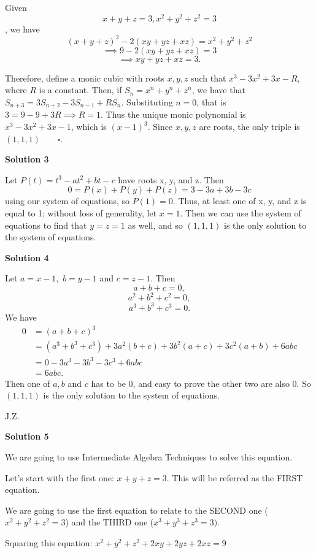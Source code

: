 \begin{enumerate}
Given 
 \[x+y+z = 3, x^2 + y^2 + z^2 = 3\], we have
 \[(x+y+z)^2 - 2(xy+yz+xz) = x^2 +y^2+z^2\]
 \[\implies 9-2(xy+yz+xz) = 3\]
 \[\implies xy+yz+xz = 3.\]

 Therefore, define a monic cubic with roots $x,y,z$ such that $x^3 - 3x^2 + 3x - R$, where $R$ is a constant. Then, if $S_n = x^n + y^n + z^n$, we have that $S_{n+3} = 3S_{n+2} - 3S_{n-1} + RS_n$. Substituting $n = 0$, that is $3 = 9 - 9 + 3R \implies R = 1$. Thus the unique monic polynomial is $x^3 - 3x^2 + 3x - 1$, which is $(x-1)^3$. Since $x,y,z$ are roots, the only triple is $(1,1,1) \qquad \square$.

 



\textbf{Solution 3}

Let $P(t)=t^3-at^2+bt-c$ have roots x, y, and z. Then 
 \[0=P(x)+P(y)+P(z)=3-3a+3b-3c\] using our system of equations, so $P(1)=0$. Thus, at least one of x, y, and z is equal to 1; without loss of generality, let $x=1$. Then we can use the system of equations to find that $y=z=1$ as well, and so $\boxed{(1,1,1)}$ is the only solution to the system of equations.

 



\textbf{Solution 4}

Let $a=x-1,$ $b=y-1$ and $c=z-1.$ Then 
 \[a+b+c=0,\]
 \[a^2+b^2+c^2=0,\]
 \[a^3+b^3+c^3=0.\]We have
 \begin{align*} 0&=(a+b+c)^3\\ &=(a^3+b^3+c^3)+3a^2(b+c)+3b^2(a+c)+3c^2(a+b)+6abc\\ &=0-3a^3-3b^3-3c^3+6abc\\ &=6abc. \end{align*}
Then one of $a, b$ and $c$ has to be 0, and easy to prove the other two are also 0. So $\boxed{(1,1,1)}$ is the only solution to the system of equations.

 J.Z.

 



\textbf{Solution 5}

We are going to use Intermediate Algebra Techniques to solve this equation.

 Let's start with the first one: $x+y+z=3$. This will be referred as the FIRST equation.

 We are going to use the first equation to relate to the SECOND one ($x^2+y^2+z^2=3$) and the THIRD one ($x^3+y^3+z^3=3)$.

 Squaring this equation: $x^2+y^2+z^2+2xy+2yz+2xz=9$


\end{enumerate}
